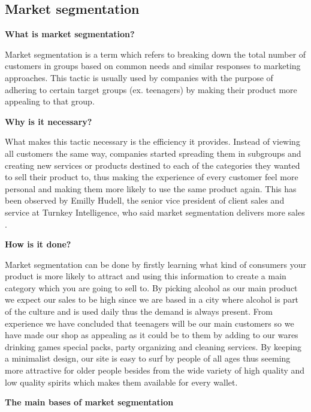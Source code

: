\documentclass[12p]{article}
\begin{document}
\newpage


\subsection{Market segmentation} \label{MarketSegmentation}

\textbf{What is market segmentation?}

Market segmentation is a term which refers to breaking down the total number of customers in groups based on common needs and similar responses to marketing approaches. This tactic is usually used by companies with the purpose of adhering to certain target groups (ex. teenagers) by making their product more appealing to that group.

\textbf{Why is it necessary?}

What makes this tactic necessary is the efficiency it provides. Instead of viewing all customers the same way, companies started spreading them in subgroups and creating new services or products destined to each of the categories they wanted to sell their product to, thus making the experience of every customer feel more personal and making them more likely to use the same product again. This has been observed by Emilly Hudell, the senior vice president of client sales and service at Turnkey Intelligence, who said market segmentation delivers more sales \cite{MarketSegmentationEfficieny}.

\textbf{How is it done?}

Market segmentation can be done by firstly learning what kind of consumers your product is more likely to attract and using this information to create a main category which you are going to sell to. By picking alcohol as our main product we expect our sales to be high since we are based in a city where alcohol is part of the culture and is used daily thus the demand is always present. From experience we have concluded that teenagers will be our main customers so we have made our shop as appealing as it could be to them by adding to our wares drinking games special packs, party organizing and cleaning services. By keeping a minimalist design, our site is easy to surf by people of all ages thus seeming more attractive for older people besides from the wide variety of high quality and low quality spirits which makes them available for every wallet.

\textbf{The main bases of market segmentation}
\end{document}
